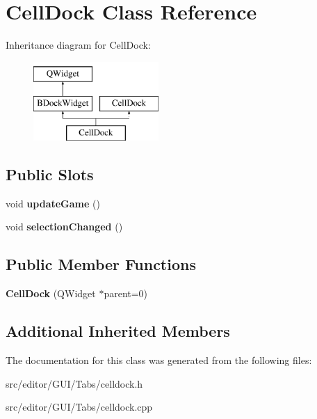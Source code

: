 \hypertarget{class_cell_dock}{}\section{Cell\+Dock Class Reference}
\label{class_cell_dock}
Inheritance diagram for Cell\+Dock\+:\begin{figure}[H]
\begin{center}
\leavevmode
\includegraphics[height=3.000000cm]{class_cell_dock}
\end{center}
\end{figure}
\subsection*{Public Slots}
\begin{DoxyCompactItemize}
\item 
\hypertarget{class_cell_dock_ac33251ff749bac9ec9bc85ae84eefd78}{}\label{class_cell_dock_ac33251ff749bac9ec9bc85ae84eefd78} 
void {\bfseries update\+Game} ()
\item 
\hypertarget{class_cell_dock_aa00bce4b3adaaf6d481f836b2e1a4f53}{}\label{class_cell_dock_aa00bce4b3adaaf6d481f836b2e1a4f53} 
void {\bfseries selection\+Changed} ()
\end{DoxyCompactItemize}
\subsection*{Public Member Functions}
\begin{DoxyCompactItemize}
\item 
\hypertarget{class_cell_dock_a7d5a1e2829fb7c9401a9f3ae7236dde4}{}\label{class_cell_dock_a7d5a1e2829fb7c9401a9f3ae7236dde4} 
{\bfseries Cell\+Dock} (Q\+Widget $\ast$parent=0)
\end{DoxyCompactItemize}
\subsection*{Additional Inherited Members}


The documentation for this class was generated from the following files\+:\begin{DoxyCompactItemize}
\item 
src/editor/\+G\+U\+I/\+Tabs/celldock.\+h\item 
src/editor/\+G\+U\+I/\+Tabs/celldock.\+cpp\end{DoxyCompactItemize}
